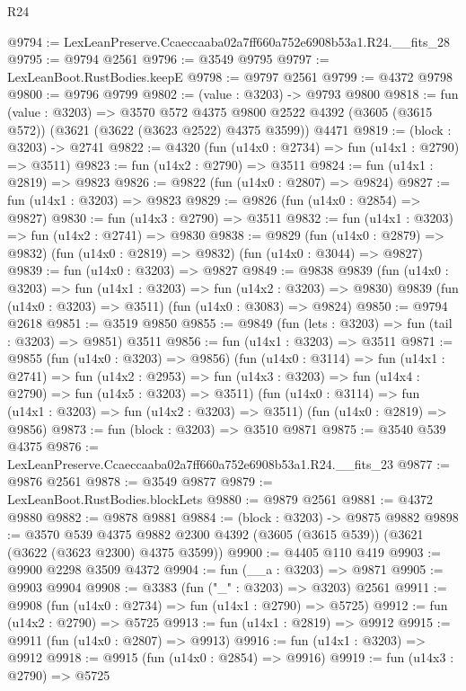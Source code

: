 \begin{lexlean}{R24}
\begin{coremodule}
@9794 := LexLeanPreserve.Ccaeccaaba02a7ff660a752e6908b53a1.R24.__fits_28
@9795 := @9794 @2561
@9796 := @3549 @9795
@9797 := LexLeanBoot.RustBodies.keepE
@9798 := @9797 @2561
@9799 := @4372 @9798
@9800 := @9796 @9799
@9802 := (value : @3203) -> @9793 @9800
@9818 := fun (value : @3203) =>
  @3570
    @572
    @4375
    @9800
    @2522
    @4392
    (@3605 (@3615 @572))
    (@3621 (@3622 (@3623 @2522) @4375 @3599))
    @4471
@9819 := (block : @3203) -> @2741
@9822 := @4320 (fun (u14x0 : @2734) => fun (u14x1 : @2790) => @3511)
@9823 := fun (u14x2 : @2790) => @3511
@9824 := fun (u14x1 : @2819) => @9823
@9826 := @9822 (fun (u14x0 : @2807) => @9824)
@9827 := fun (u14x1 : @3203) => @9823
@9829 := @9826 (fun (u14x0 : @2854) => @9827)
@9830 := fun (u14x3 : @2790) => @3511
@9832 := fun (u14x1 : @3203) => fun (u14x2 : @2741) => @9830
@9838 := @9829
    (fun (u14x0 : @2879) => @9832)
    (fun (u14x0 : @2819) => @9832)
    (fun (u14x0 : @3044) => @9827)
@9839 := fun (u14x0 : @3203) => @9827
@9849 := @9838
    @9839
    (fun (u14x0 : @3203) => fun (u14x1 : @3203) => fun (u14x2 : @3203) => @9830)
    @9839
    (fun (u14x0 : @3203) => @3511)
    (fun (u14x0 : @3083) => @9824)
@9850 := @9794 @2618
@9851 := @3519 @9850
@9855 := @9849 (fun (lets : @3203) => fun (tail : @3203) => @9851) @3511
@9856 := fun (u14x1 : @3203) => @3511
@9871 := @9855
    (fun (u14x0 : @3203) => @9856)
    (fun (u14x0 : @3114) =>
    fun (u14x1 : @2741) =>
    fun (u14x2 : @2953) =>
    fun (u14x3 : @3203) => fun (u14x4 : @2790) => fun (u14x5 : @3203) => @3511)
    (fun (u14x0 : @3114) => fun (u14x1 : @3203) => fun (u14x2 : @3203) => @3511)
    (fun (u14x0 : @2819) => @9856)
@9873 := fun (block : @3203) => @3510 @9871
@9875 := @3540 @539 @4375
@9876 := LexLeanPreserve.Ccaeccaaba02a7ff660a752e6908b53a1.R24.__fits_23
@9877 := @9876 @2561
@9878 := @3549 @9877
@9879 := LexLeanBoot.RustBodies.blockLets
@9880 := @9879 @2561
@9881 := @4372 @9880
@9882 := @9878 @9881
@9884 := (block : @3203) -> @9875 @9882
@9898 := @3570
    @539
    @4375
    @9882
    @2300
    @4392
    (@3605 (@3615 @539))
    (@3621 (@3622 (@3623 @2300) @4375 @3599))
@9900 := @4405 @110 @419
@9903 := @9900 @2298 @3509 @4372
@9904 := fun (__a : @3203) => @9871
@9905 := @9903 @9904
@9908 := @3383 (fun ("_" : @3203) => @3203) @2561
@9911 := @9908 (fun (u14x0 : @2734) => fun (u14x1 : @2790) => @5725)
@9912 := fun (u14x2 : @2790) => @5725
@9913 := fun (u14x1 : @2819) => @9912
@9915 := @9911 (fun (u14x0 : @2807) => @9913)
@9916 := fun (u14x1 : @3203) => @9912
@9918 := @9915 (fun (u14x0 : @2854) => @9916)
@9919 := fun (u14x3 : @2790) => @5725

\end{coremodule}
\end{lexlean}
